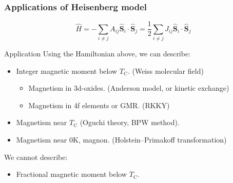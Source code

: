 \documentclass{beamer}
\begin{document}
  \begin{frame}
    \frametitle{Applications of Heisenberg model}
    \begin{equation*}
      \widehat{H} = -\sum_{i\ne{}j}A_{ij}\widehat{\bm{S}}_i\cdot\widehat{\bm{S}}_j = \dfrac{1}{2}\sum_{i\ne{}j}J_{ij}\widehat{\bm{S}}_i\cdot\widehat{\bm{S}}_j
    \end{equation*}
    \begin{block}{Application}
      Using the Hamiltonian above, we can describe:
    \begin{itemize}
      \item Integer magnetic moment below \(T_\text{C}\). (Weiss molecular field)
      \begin{itemize}
        \item Magnetism in 3d-oxides. (Anderson model, or kinetic exchange)
        \item Magnetism in 4f elements or GMR. (RKKY)
      \end{itemize}
      \item Magnetism near \(T_\text{C}\) (Oguchi theory, BPW method).
      \item Magnetism near 0K, magnon. (Holstein–Primakoff transformation)
    \end{itemize}
    We cannot describe:
    \begin{itemize}
      \item Fractional magnetic moment below \(T_\text{C}\). 
    \end{itemize}
    \end{block}
  \end{frame}
\end{document}
